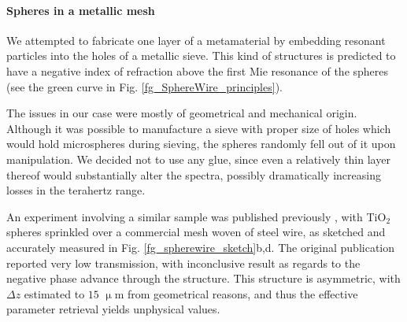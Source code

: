 \paragraph{Spheres in a metallic mesh} %
We attempted to fabricate one layer of a metamaterial by embedding resonant particles into the holes of a metallic sieve. This kind of structures is predicted to have a negative index of refraction above the first Mie resonance of the spheres (see the green curve in Fig. \ref{fg_SphereWire_principles}). 

The issues in our case were mostly of geometrical and mechanical origin. Although it was possible to manufacture a sieve with proper size of holes which would hold microspheres during sieving, the spheres randomly fell out of it upon manipulation. We decided not to use any glue, since even a relatively thin layer thereof would substantially alter the spectra, possibly dramatically increasing losses in the terahertz range.

An experiment involving a similar sample was published previously \cite{yakiyama2012terahertz}, with TiO$_{2}$ spheres sprinkled over a commercial mesh woven of steel wire, as sketched and accurately measured in Fig. \ref{fg_spherewire_sketch}b,d. The original publication reported very low transmission, with inconclusive result as regards to the negative phase advance through the structure. This structure is asymmetric, with $\Delta z$ estimated to $15$ $\upmu$m from geometrical reasons, and thus the effective parameter retrieval yields unphysical values.

%    




